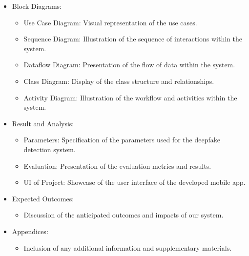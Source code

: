 \begin{itemize}
      \item Block Diagrams:
      \begin{itemize}
        \item Use Case Diagram: Visual representation of the use cases.
        \item Sequence Diagram: Illustration of the sequence of interactions within the system.
        \item Dataflow Diagram: Presentation of the flow of data within the system.
        \item Class Diagram: Display of the class structure and relationships.
        \item Activity Diagram: Illustration of the workflow and activities within the system.
      \end{itemize}
  
    \item Result and Analysis:
      \begin{itemize}
        \item Parameters: Specification of the parameters used for the deepfake detection system.
        \item Evaluation: Presentation of the evaluation metrics and results.
        \item UI of Project: Showcase of the user interface of the developed mobile app.
      \end{itemize}
  
    \item Expected Outcomes:
      \begin{itemize}
        \item Discussion of the anticipated outcomes and impacts of our system.
      \end{itemize}
  
    \item Appendices:
      \begin{itemize}
        \item Inclusion of any additional information and supplementary materials.
      \end{itemize}
  \end{itemize}


